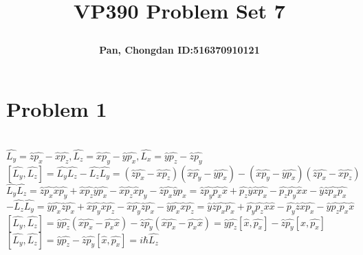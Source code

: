\documentclass[a4paper]{article}
\title{\Large \textbf{VP390 Problem Set 7}\\
\author{\textbf{Pan, Chongdan ID:516370910121}\\
}
}
\begin{document}
\maketitle
\section{Problem 1}
\noindent
\\$\hat{L_y}=\hat{z}\hat{p_x}-\hat{x}\hat{p_z},\hat{L_z}=\hat{x}\hat{p_y}-\hat{y}\hat{p_x},\hat{L_x}=\hat{y}\hat{p_z}-\hat{z}\hat{p_y}$
\\$[\hat{L_y},\hat{L_z}]=\hat{L_y}\hat{L_z}-\hat{L_z}\hat{L_y}=(\hat{z}\hat{p_x}-\hat{x}\hat{p_z})(\hat{x}\hat{p_y}-\hat{y}\hat{p_x})-(\hat{x}\hat{p_y}-\hat{y}\hat{p_x})(\hat{z}\hat{p_x}-\hat{x}\hat{p_z})$
\\$\hat{L_y}\hat{L_z}=\hat{z}\hat{p_x}\hat{x}\hat{p_y}+\hat{x}\hat{p_z}\hat{y}\hat{p_x}-\hat{x}\hat{p_z}\hat{x}\hat{p_y}-\hat{z}\hat{p_x}\hat{y}\hat{p_x}=\hat{z}\hat{p_y}\hat{p_x}\hat{x}+\hat{p_z}\hat{y}\hat{x}\hat{p_x}-\hat{p_z}\hat{p_y}\hat{x}\hat{x}-\hat{y}\hat{z}\hat{p_x}\hat{p_x}$
\\$-\hat{L_z}\hat{L_y}=\hat{y}\hat{p_x}\hat{z}\hat{p_x}+\hat{x}\hat{p_y}\hat{x}\hat{p_z}-\hat{x}\hat{p_y}\hat{z}\hat{p_x}-\hat{y}\hat{p_x}\hat{x}\hat{p_z}=\hat{y}\hat{z}\hat{p_x}\hat{p_x}+\hat{p_y}\hat{p_z}\hat{x}\hat{x}-\hat{p_y}\hat{z}\hat{x}\hat{p_x}-\hat{y}\hat{p_z}\hat{p_x}\hat{x}$
\\$[\hat{L_y},\hat{L_z}]=\hat{y}\hat{p_z}(\hat{x}\hat{p_x}-\hat{p_x}\hat{x})-\hat{z}\hat{p_y}(\hat{x}\hat{p_x}-\hat{p_x}\hat{x})=\hat{y}\hat{p_z}[\hat{x},\hat{p_x}]-\hat{z}\hat{p_y}[\hat{x},\hat{p_x}]$
\\$[\hat{L_y},\hat{L_z}]=\hat{y}\hat{p_z}-\hat{z}\hat{p_y}[\hat{x},\hat{p_x}]=i\hbar\hat{L_z}$
\end{document}
